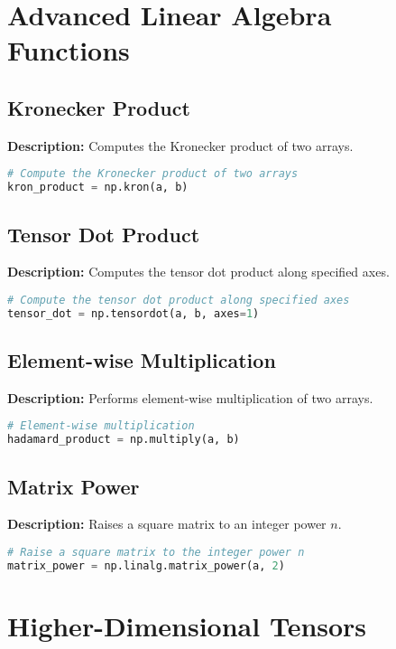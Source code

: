 \documentclass[a4paper, 12pt]{article}
\begin{document}
\section{Advanced Linear Algebra Functions}

\subsection{Kronecker Product}
\textbf{Description:} Computes the Kronecker product of two arrays.

\begin{lstlisting}[language=Python]
# Compute the Kronecker product of two arrays
kron_product = np.kron(a, b)
\end{lstlisting}

\subsection{Tensor Dot Product}
\textbf{Description:} Computes the tensor dot product along specified axes.

\begin{lstlisting}[language=Python]
# Compute the tensor dot product along specified axes
tensor_dot = np.tensordot(a, b, axes=1)
\end{lstlisting}

\subsection{Element-wise Multiplication}
\textbf{Description:} Performs element-wise multiplication of two arrays.

\begin{lstlisting}[language=Python]
# Element-wise multiplication
hadamard_product = np.multiply(a, b)
\end{lstlisting}

\subsection{Matrix Power}
\textbf{Description:} Raises a square matrix to an integer power \(n\).

\begin{lstlisting}[language=Python]
# Raise a square matrix to the integer power n
matrix_power = np.linalg.matrix_power(a, 2)
\end{lstlisting}

\section{Higher-Dimensional Tensors}
\end{document}
